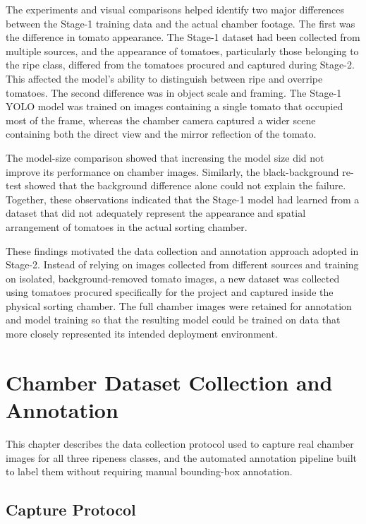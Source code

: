 \documentclass[12pt,a4paper]{report}
\begin{document}
The experiments and visual comparisons helped identify two major differences between the Stage-1 training data and the actual chamber footage. The first was the difference in tomato appearance. The Stage-1 dataset had been collected from multiple sources, and the appearance of tomatoes, particularly those belonging to the ripe class, differed from the tomatoes procured and captured during Stage-2. This affected the model's ability to distinguish between ripe and overripe tomatoes. The second difference was in object scale and framing. The Stage-1 YOLO model was trained on images containing a single tomato that occupied most of the frame, whereas the chamber camera captured a wider scene containing both the direct view and the mirror reflection of the tomato.

The model-size comparison showed that increasing the model size did not improve its performance on chamber images. Similarly, the black-background re-test showed that the background difference alone could not explain the failure. Together, these observations indicated that the Stage-1 model had learned from a dataset that did not adequately represent the appearance and spatial arrangement of tomatoes in the actual sorting chamber.

These findings motivated the data collection and annotation approach adopted in Stage-2. Instead of relying on images collected from different sources and training on isolated, background-removed tomato images, a new dataset was collected using tomatoes procured specifically for the project and captured inside the physical sorting chamber. The full chamber images were retained for annotation and model training so that the resulting model could be trained on data that more closely represented its intended deployment environment.

\chapter{Chamber Dataset Collection and Annotation}

This chapter describes the data collection protocol used to capture real chamber images for all three ripeness classes, and the automated annotation pipeline built to label them without requiring manual bounding-box annotation.

\section{Capture Protocol}
\end{document}

